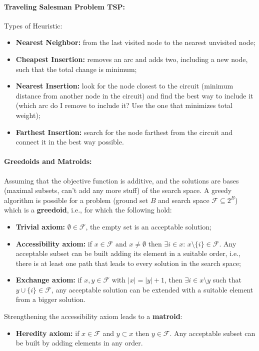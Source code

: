 \documentclass{article}
\begin{document}
	\paragraph{Traveling Salesman Problem TSP:} Types of Heuristic: 
	\begin{itemize}
		\item \textbf{Nearest Neighbor:} from the last visited node to the nearest unvisited node;
		\item \textbf{Cheapest Insertion:} removes an arc and adds two, including a new node, such that the total change is minimum;
		\item \textbf{Nearest Insertion:} look for the node closest to the circuit (minimum distance from another node in the circuit) and find the best way to include it (which arc do I remove to include it? Use the one that minimizes total weight);
		\item \textbf{Farthest Insertion:} search for the node farthest from the circuit and connect it in the best way possible.\\
	\end{itemize}
	
	\paragraph{Greedoids and Matroids:} Assuming that the objective function is additive, and the solutions are bases (maximal subsets, can't add any more stuff) of the search space. A greedy algorithm is possible for a problem (ground set $B$ and search space $\mathcal{F} \subseteq 2^B$) which is a \textbf{greedoid}, i.e., for which the following hold: 
	\begin{itemize}
		\item \textbf{Trivial axiom:} $\emptyset \in \mathcal{F}$, the empty set is an acceptable solution;
		\item \textbf{Accessibility axiom:} if $x \in \mathcal{F}$ and $x \neq \emptyset$ then $\exists i \in x : \, x \setminus \{i\} \in \mathcal{F}$. Any acceptable subset can be built adding its element in a suitable order, i.e., there is at least one path that leads to every solution in the search space;
		\item \textbf{Exchange axiom:}  if $x, y \in \mathcal{F}$ with $|x| = |y| + 1$, then $\exists i \in x \setminus y$ such that $y \cup \{i\} \in \mathcal{F}$, any acceptable solution can be extended with a suitable element from a bigger solution.
	\end{itemize}
	Strengthening the accessibility axiom leads to a \textbf{matroid}: 
	\begin{itemize}
		\item \textbf{Heredity axiom:} if $x \in \mathcal{F}$ and $y \subset x$ then $y \in \mathcal{F}$. Any acceptable subset can be built by adding elements in any order.\\
	\end{itemize}
	
\end{document}
